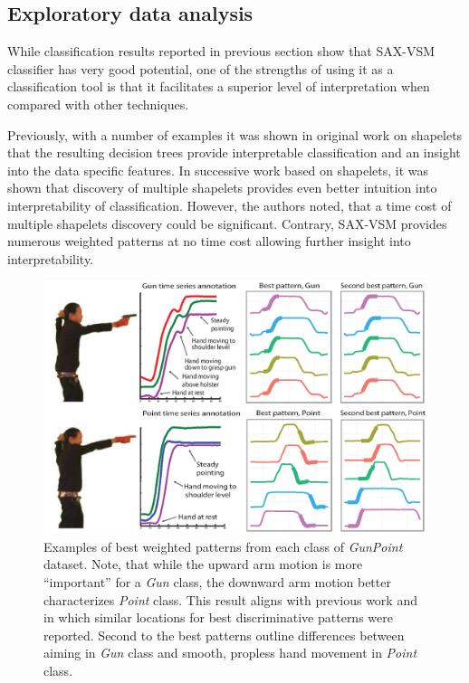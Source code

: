 \documentclass{llncs}
\begin{document}
\subsection{Exploratory data analysis}
While classification results reported in previous section show that SAX-VSM classifier
has very good potential, one of the strengths of using it as a classification tool is that
it facilitates a superior level of interpretation when compared with other techniques. 

Previously, with a number of examples it was shown in original work on shapelets \cite{shapelet}
that the resulting decision trees provide interpretable classification and an insight into the data
specific features. In successive work \cite{bagnal} based on shapelets, it was shown that
discovery of multiple shapelets provides even better intuition into interpretability of
classification. However, the authors noted, that a time cost of multiple shapelets discovery
could be significant. Contrary, SAX-VSM provides numerous weighted patterns at no time cost
allowing further insight into interpretability.

\begin{figure}[t]
   \centering
   \includegraphics[width=120mm]{figures/gun-point.eps}
   \caption{Examples of best weighted patterns from each class of \textit{GunPoint} dataset. 
   Note, that while the upward arm motion is more ``important'' for a \textit{Gun} class, 
   the downward arm motion better characterizes \textit{Point} class. 
   This result aligns with previous work \cite{shapelet} and \cite{bagnal} in which similar 
   locations for best discriminative patterns were reported. 
   Second to the best patterns outline differences between aiming in \textit{Gun} class and
   smooth, propless hand movement in \textit{Point} class.
   }
   \label{fig:shapelet-like-patterns}
\end{figure}
\end{document}
